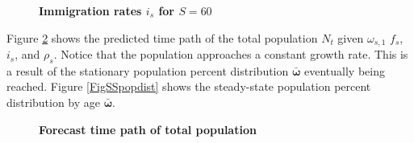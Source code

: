 \documentclass[letterpaper,12pt]{article}
\theoremstyle{definition}
\begin{document}
  \begin{figure}[htbp]\centering \captionsetup{width=4.0in}
    \caption{\label{FigImmigRates}\textbf{Immigration rates $i_s$ for $S=60$}}
  \end{figure}

  Figure \ref{FigPopPath} shows the predicted time path of the total population $N_t$ given $\omega_{s,1}$ $f_s$, $i_s$, and $\rho_s$. Notice that the population approaches a constant growth rate. This is a result of the stationary population percent distribution $\bm{\bar{\omega}}$ eventually being reached. Figure \ref{FigSSpopdist} shows the steady-state population percent distribution by age $\bm{\bar{\omega}}$.

  \begin{figure}[htbp]\centering \captionsetup{width=4.0in}
    \caption{\label{FigPopPath}\textbf{Forecast time path of total population}}
  \end{figure}
\end{document}
